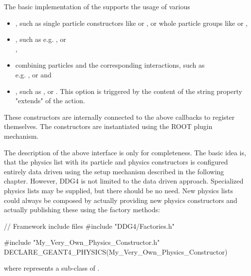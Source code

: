 \noindent
The basic implementation of the  supports the usage of various
\begin{itemize}\itemcompact
\item {}, 
    such as single particle constructors like   
     or , or whole particle groups like
     or ,
\item {}, 
    such as e.g. ,
     or\\ , 
\item {} 
    combining particles and the corresponding 
    interactions, such as\\ e.g. ,
     or  and
\item {}, 
    such as ,
     or . This option is triggered by the 
    content of the string property "extends" of the  action.
\end{itemize}
These constructors are internally connected to the above callbacks to register themselves. 
The constructors are instantiated using the ROOT plugin mechanism.

\noindent
The description of the above interface is only for completeness. The basic idea is,
that the physics list with its particle and physics constructors is configured
entirely data driven using the setup mechanism described in the following
chapter. However, DDG4 is not limited to the data driven approach. Specialized 
physics lists may be supplied, but there should be no need.
New physics lists could always be composed by actually providing new physics
constructors and actually publishing these using the factory methods:
\begin{code}
// Framework include files
#include "DDG4/Factories.h"

#include "My_Very_Own_Physics_Constructor.h"
DECLARE_GEANT4_PHYSICS(My_Very_Own_Physics_Constructor)
\end{code}
where  represents a sub-class of
.

